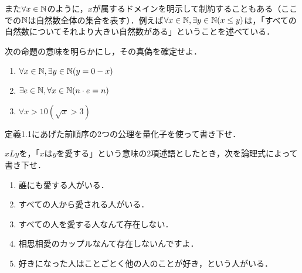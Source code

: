 \documentclass[11pt,a4paper]{jsarticle}
\begin{document}
また$\forall x \in \mathbb{N}$のように，$x$が属するドメインを明示して制約することもある（ここでの$\mathbb{N}$は自然数全体の集合を表す）．例えば$\forall x \in \mathbb{N}, \exists y \in \mathbb{N} (x \leq y)$は，「すべての自然数についてそれより大きい自然数がある」ということを述べている．


\begin{exercise}
 次の命題の意味を明らかにし，その真偽を確定せよ．
\begin{enumerate}
 \item $\forall x \in \mathbb{N}, \exists y \in \mathbb{N} (y = 0 - x)$
 \item $\exists e \in \mathbb{N}, \forall x \in \mathbb{N} (n \cdot e = n)$
 \item $\forall x > 10 (\sqrt{x} > 3)$
\end{enumerate}
\end{exercise}

\begin{exercise}
 定義1.1にあげた前順序の2つの公理を量化子を使って書き下せ．
\end{exercise}


\begin{exercise}
 $xLy$を，「$x$は$y$を愛する」という意味の2項述語としたとき，次を論理式によって書き下せ．
\begin{enumerate}
 \item 誰にも愛する人がいる．
 \item すべての人から愛される人がいる．
 \item すべての人を愛する人なんて存在しない．
 \item 相思相愛のカップルなんて存在しないんですよ．
 \item 好きになった人はことごとく他の人のことが好き，という人がいる．
\end{enumerate}

\end{exercise}
\end{document}
